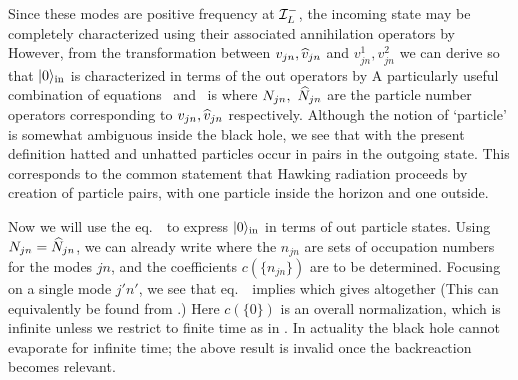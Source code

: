 Since these modes are positive frequency at ${\cal I}_L^-$, the incoming
state may be completely characterized using their associated
annihilation operators by
%
\eqn{}
%
However, from the transformation between
$v_{jn},{\widehat v}_{jn} $ and $v^{1}_{jn},v^{2}_{jn} $
we can derive
%
\eqn{}
%
so that $|0\rangle_{\rm in}$ is characterized in terms of the out operators by
%
\eqn{}
%
A particularly useful combination of equations \wone\ and \wtwo\ is
%
\eqn{}
%
where $N_{jn},\ {\widehat N}_{jn}$ are the particle number operators
corresponding to $v_{jn},{\widehat v}_{jn}$ respectively.
Although the notion of `particle' is somewhat ambiguous inside the black
hole, we see that with the present definition
hatted and unhatted particles occur in pairs in the outgoing state.
This
corresponds to the common statement that Hawking radiation proceeds by
creation of particle pairs, with one particle inside the
horizon and one outside.

Now we will use the eq.~\wthree\ to express $|0\rangle_{\rm in}$ in terms of out
particle states. Using $N_{jn}={\widehat N}_{jn}$, we can already write \Parker
%
\eqn{}
%
where the ${n_{jn}}$ are sets of occupation numbers for the modes $jn$,
and the coefficients $c\left(\{ n_{jn} \} \right)$ are to be determined.
Focusing on a single mode $j'n'$, we see that eq.~\wthree\ implies
%
\eqn{}
%
which gives altogether
%
\eqn{}
%
(This can equivalently be found from \vacreln.)
Here $c(\{0\})$ is an overall normalization, which is infinite unless we
restrict to finite time as in \norme.  In actuality the black hole cannot
evaporate for infinite time; the above result is invalid once the
backreaction becomes relevant.

